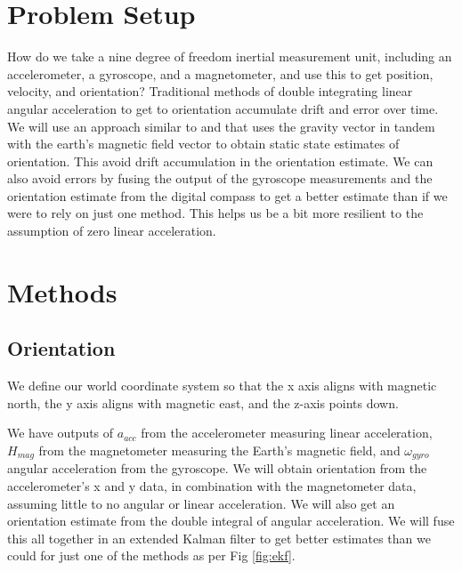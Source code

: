 \documentclass[conference]{IEEEtran}
\begin{document}
\section{Problem Setup}

How do we take a nine degree of freedom inertial measurement unit, including an accelerometer, a gyroscope, and a magnetometer, and use this to get position, velocity, and orientation? Traditional methods of double integrating linear angular acceleration to get to orientation accumulate drift and error over time. We will use an approach similar to \cite{b19} and \cite{b21} that uses the gravity vector in tandem with the earth's magnetic field vector to obtain static state estimates of orientation. This avoid drift accumulation in the orientation estimate. We can also avoid errors by fusing the output of the gyroscope measurements and the orientation estimate from the digital compass to get a better estimate than if we were to rely on just one method. This helps us be a bit more resilient to the assumption of zero linear acceleration.

\section{Methods}

\subsection{Orientation}

We define our world coordinate system so that the x axis aligns with magnetic north, the y axis aligns with magnetic east, and the z-axis points down.  

We have outputs of $a_{acc}$ from the accelerometer measuring linear acceleration, $H_{mag}$ from the magnetometer measuring the Earth's magnetic field, and $\omega_{gyro}$ angular acceleration from the gyroscope. We will obtain orientation from the accelerometer's x and y data, in combination with the magnetometer data, assuming little to no angular or linear acceleration. We will also get an orientation estimate from the double integral of angular acceleration. We will fuse this all together in an extended Kalman filter to get better estimates than we could for just one of the methods as per Fig \ref{fig:ekf}.
\end{document}
